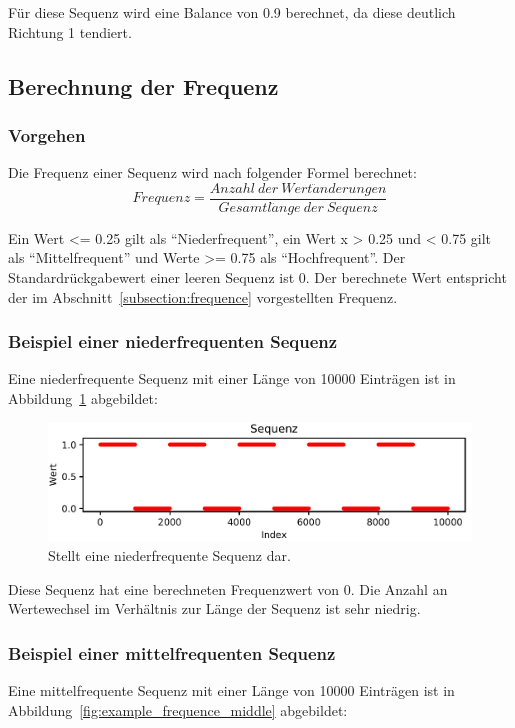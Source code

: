 Für diese Sequenz wird eine Balance von 0.9 berechnet, da diese deutlich Richtung 1 tendiert. 
\subsection{Berechnung der Frequenz}

\subsubsection{Vorgehen}
Die Frequenz einer Sequenz wird nach folgender Formel berechnet:
\[
Frequenz = \frac{Anzahl\ der\ Wert\ddot{a}nderungen}{Gesamtl\ddot{a}nge\ der\ Sequenz}
\]

Ein Wert <= 0.25 gilt als \enquote{Niederfrequent}, ein Wert x > 0.25 und < 0.75 gilt als \enquote{Mittelfrequent} und Werte >= 0.75 als \enquote{Hochfrequent}.
Der Standardrückgabewert einer leeren Sequenz ist 0. 
Der berechnete Wert entspricht der im Abschnitt~\ref{subsection:frequence} vorgestellten Frequenz.

\subsubsection{Beispiel einer niederfrequenten Sequenz}
Eine niederfrequente Sequenz mit einer Länge von 10000 Einträgen ist in Abbildung~\ref{fig:example_frequence_low} abgebildet:

\begin{figure}[H]
	\includegraphics[width=\linewidth]{pythonImplementation/images/example_frequence_low.PNG}
	\caption[Darstellung einer niederfrequenten Sequenz]{Stellt eine niederfrequente Sequenz dar\footnotemark.}
	\label{fig:example_frequence_low}
\end{figure}

Diese Sequenz hat eine berechneten Frequenzwert von 0. Die Anzahl an Wertewechsel im Verhältnis zur Länge der Sequenz ist sehr niedrig.

\subsubsection{Beispiel einer mittelfrequenten Sequenz}
Eine mittelfrequente Sequenz mit einer Länge von 10000 Einträgen ist in Abbildung~\ref{fig:example_frequence_middle} abgebildet:

